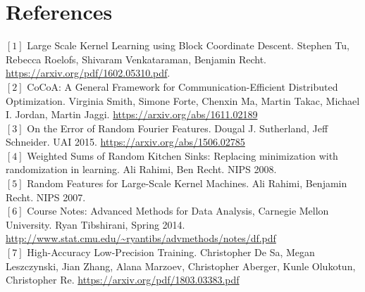 \documentclass[12pt]{article}
\begin{document}
\section{References}
\noindent$[1]$ Large Scale Kernel Learning using Block Coordinate Descent.
Stephen Tu, Rebecca Roelofs, Shivaram Venkataraman, Benjamin Recht. \url{https://arxiv.org/pdf/1602.05310.pdf}. \\
$[2]$ CoCoA: A General Framework for Communication-Efficient Distributed Optimization.
Virginia Smith, Simone Forte, Chenxin Ma, Martin Takac, Michael I. Jordan, Martin Jaggi.  \url{https://arxiv.org/abs/1611.02189} \\
$[3]$ On the Error of Random Fourier Features. Dougal J. Sutherland, Jeff Schneider. UAI 2015. \url{https://arxiv.org/abs/1506.02785}\\
$[4]$ Weighted Sums of Random Kitchen Sinks: Replacing minimization with randomization in learning. Ali Rahimi, Ben Recht. NIPS 2008.\\
$[5]$	Random Features for Large-Scale Kernel Machines. Ali Rahimi, Benjamin Recht. NIPS 2007.\\
$[6]$  Course Notes: Advanced Methods for Data Analysis, Carnegie Mellon University.  Ryan Tibshirani, Spring 2014. \url{http://www.stat.cmu.edu/~ryantibs/advmethods/notes/df.pdf}\\
$[7]$ High-Accuracy Low-Precision Training. Christopher De Sa, Megan Leszczynski, Jian Zhang, Alana Marzoev,
Christopher Aberger, Kunle Olukotun, Christopher Re. \url{https://arxiv.org/pdf/1803.03383.pdf}
\end{document}
